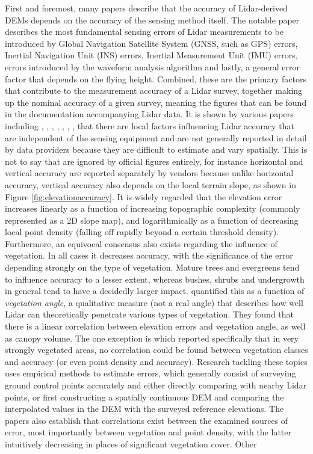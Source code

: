 First and foremost, many papers describe that the accuracy of Lidar-derived DEMs depends on the accuracy of the sensing method itself. The notable paper \cite{hodgson_breshanan_2004} describes the most fundamental sensing errors of Lidar measurements to be introduced by Global Navigation Satellite System (GNSS, such as GPS) errors, Inertial Navigation Unit (INS) errors, Inertial Measurement Unit (IMU) errors, errors introduced by the waveform analysis algorithm and lastly, a general error factor that depends on the flying height. Combined, these are the primary factors that contribute to the measurement accuracy of a Lidar survey, together making up the nominal accuracy of a given survey, meaning the figures that can be found in the documentation accompanying Lidar data. It is shown by various papers including \cite{hodgson_breshanan_2004}, \cite{su_bork_2006}, \cite{kraus_etal_2006}, \cite{raber_etal_2007}, \cite{peng_shih_2006}, \cite{chow_hodgson_2009}, \cite{aguilar_etal_2005}, \cite{aguilar_etal_2010} \cite{guo_etal_2010} that there are local factors influencing Lidar accuracy that are independent of the sensing equipment and are not generally reported in detail by data providers because they are difficult to estimate and vary spatially. This is not to say that are ignored by official figures entirely, for instance horizontal and vertical accuracy are reported separately by vendors because unlike horizontal accuracy, vertical accuracy also depends on the local terrain slope, as shown in Figure \ref{fig:elevationaccuracy}. It is widely regarded that the elevation error increases linearly as a function of increasing topographic complexity (commonly represented as a 2D slope map), and logarithmically as a function of decreasing local point density (falling off rapidly beyond a certain threshold density). Furthermore, an equivocal consensus also exists regarding the influence of vegetation. In all cases it decreases accuracy, with the significance of the error depending strongly on the type of vegetation. Mature trees and evergreens tend to influence accuracy to a lesser extent, whereas bushes, shrubs and undergrowth in general tend to have a decidedly larger impact. \cite{peng_shih_2006} quantified this as a function of \textit{vegetation angle}, a qualitative measure (not a real angle) that describes how well Lidar can theoretically penetrate various types of vegetation. They found that there is a linear correlation between elevation errors and vegetation angle, as well as canopy volume. The one exception is \cite{raber_etal_2007} which reported specifically that in very strongly vegetated areas, no correlation could be found between vegetation classes and accuracy (or even point density and accuracy). Research tackling these topics uses empirical methods to estimate errors, which generally consist of surveying ground control points accurately and either directly comparing with nearby Lidar points, or first constructing a spatially continuous DEM and comparing the interpolated values in the DEM with the surveyed reference elevations. The papers also establish that correlations exist between the examined sources of error, most importantly between vegetation and point density, with the latter intuitively decreasing in places of significant vegetation cover. Other 